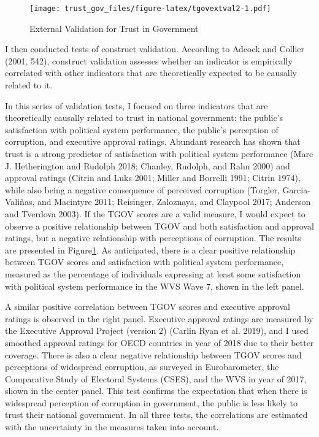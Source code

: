 \documentclass[
  12pt,
]{article}
\begin{document}
\begin{figure}
\centering
\texttt{[image: trust\_gov\_files/figure-latex/tgovextval2-1.pdf]}
\caption{\label{fig:tgovextval2}External Validation for Trust in Government \label{tgov_ev2}}
\end{figure}

I then conducted tests of construct validation.
According to Adcock and Collier (2001, 542), construct validation assesses whether an indicator is empirically correlated with other indicators that are theoretically expected to be causally related to it.

In this series of validation tests, I focused on three indicators that are theoretically causally related to trust in national government: the public's satisfaction with political system performance, the public's perception of corruption, and executive approval ratings.
Abundant research has shown that trust is a strong predictor of satisfaction with political system performance (Marc J. Hetherington and Rudolph 2018; Chanley, Rudolph, and Rahn 2000) and approval ratings (Citrin and Luks 2001; Miller and Borrelli 1991; Citrin 1974), while also being a negative consequence of perceived corruption (Torgler, Garcia-Valiñas, and Macintyre 2011; Reisinger, Zaloznaya, and Claypool 2017; Anderson and Tverdova 2003).
If the TGOV scores are a valid measure, I would expect to observe a positive relationship between TGOV and both satisfaction and approval ratings, but a negative relationship with perceptions of corruption.
The results are presented in Figure\nobreakspace{}\ref{tgov_ev2}.
As anticipated, there is a clear positive relationship between TGOV scores and satisfaction with political system performance, measured as the percentage of individuals expressing at least some satisfaction with political system performance in the WVS Wave 7, shown in the left panel.

A similar positive correlation between TGOV scores and executive approval ratings is observed in the right panel.
Executive approval ratings are measured by the Executive Approval Project (version 2) (Carlin Ryan et al. 2019), and I used smoothed approval ratings for OECD countries in year of 2018 due to their better coverage.
There is also a clear negative relationship between TGOV scores and perceptions of widespread corruption, as surveyed in Eurobarometer, the Comparative Study of Electoral Systems (CSES), and the WVS in year of 2017, shown in the center panel.
This test confirms the expectation that when there is widespread perception of corruption in government, the public is less likely to trust their national government.
In all three tests, the correlations are estimated with the uncertainty in the measures taken into account.
\end{document}
